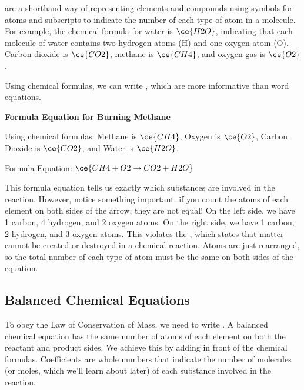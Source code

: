  are a shorthand way of representing elements and compounds using symbols for atoms and subscripts to indicate the number of each type of atom in a molecule. For example, the chemical formula for water is $\ce{H2O}$, indicating that each molecule of water contains two hydrogen atoms (H) and one oxygen atom (O). Carbon dioxide is $\ce{CO2}$, methane is $\ce{CH4}$, and oxygen gas is $\ce{O2}$.

Using chemical formulas, we can write , which are more informative than word equations.

\begin{example}
\textbf{Formula Equation for Burning Methane}

Using chemical formulas: Methane is $\ce{CH4}$, Oxygen is $\ce{O2}$, Carbon Dioxide is $\ce{CO2}$, and Water is $\ce{H2O}$.

Formula Equation:
\texttt{$\ce{CH4 + O2 \rightarrow CO2 + H2O}$}
\end{example}

This formula equation tells us exactly which substances are involved in the reaction. However, notice something important: if you count the atoms of each element on both sides of the arrow, they are not equal!  On the left side, we have 1 carbon, 4 hydrogen, and 2 oxygen atoms. On the right side, we have 1 carbon, 2 hydrogen, and 3 oxygen atoms. This violates the , which states that matter cannot be created or destroyed in a chemical reaction.  Atoms are just rearranged, so the total number of each type of atom must be the same on both sides of the equation.

\subsection{Balanced Chemical Equations}


To obey the Law of Conservation of Mass, we need to write .  A balanced chemical equation has the same number of atoms of each element on both the reactant and product sides.  We achieve this by adding  in front of the chemical formulas. Coefficients are whole numbers that indicate the number of molecules (or moles, which we'll learn about later) of each substance involved in the reaction.

